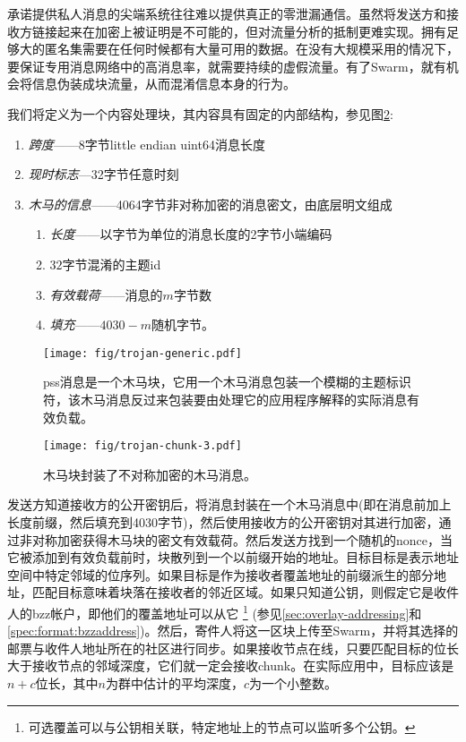 承诺提供私人消息的尖端系统往往难以提供真正的零泄漏通信\cite{kwon2016riffle}。虽然将发送方和接收方链接起来在加密上被证明是不可能的，但对流量分析的抵制更难实现。拥有足够大的匿名集需要在任何时候都有大量可用的数据。在没有大规模采用的情况下，要保证专用消息网络中的高消息率，就需要持续的虚假流量。有了Swarm，就有机会将信息伪装成块流量，从而混淆信息本身的行为。

我们将定义为一个内容处理块，其内容具有固定的内部结构，参见图\ref{fig:trojan-chunk}:

\begin{enumerate}
    \item \emph{跨度}——8字节little endian uint64消息长度  
    \item \emph{现时标志}—32字节任意时刻 
    \item \emph{木马的信息}——4064字节非对称加密的消息密文，由底层明文组成
\begin{enumerate}
        \item \emph{长度}——以字节为单位的消息长度的2字节小端编码
        \item $32$字节混淆的主题id   
        \item \emph{有效载荷}——消息的$m$字节数 
        \item \emph{填充}——$4030-m$随机字节。
    \end{enumerate}
\end{enumerate}

\begin{figure}[htbp]
\centering
\texttt{[image: fig/trojan-generic.pdf]}
\caption[木马块或pss message\statusgreen]{pss消息是一个木马块，它用一个木马消息包装一个模糊的主题标识符，该木马消息反过来包装要由处理它的应用程序解释的实际消息有效负载。}
\label{fig:trojan-generic}
\end{figure}

\begin{figure}[htbp]
\centering
\texttt{[image: fig/trojan-chunk-3.pdf]}
\caption[木马chunk\statusgreen]{木马块封装了不对称加密的木马消息。}
\label{fig:trojan-chunk}
\end{figure}

发送方知道接收方的公开密钥后，将消息封装在一个木马消息中(即在消息前加上长度前缀，然后填充到4030字节)，然后使用接收方的公开密钥对其进行加密，通过非对称加密获得木马块的密文有效载荷。然后发送方找到一个随机的nonce，当它被添加到有效负载前时，块散列到一个以前缀开始的地址。目标目标是表示地址空间中特定邻域的位序列。如果目标是作为接收者覆盖地址的前缀派生的部分地址，匹配目标意味着块落在接收者的邻近区域。如果只知道公钥，则假定它是收件人的bzz帐户，即他们的覆盖地址可以从它%
%
\footnote{可选覆盖可以与公钥相关联，特定地址上的节点可以监听多个公钥。}
%
(参见\ref{sec:overlay-addressing}和\ref{spec:format:bzzaddress})。然后，寄件人将这一区块上传至Swarm，并将其选择的邮票与收件人地址所在的社区进行同步。如果接收节点在线，只要匹配目标的位长大于接收节点的邻域深度，它们就一定会接收chunk。在实际应用中，目标应该是$n+c$位长，其中$n$为群中估计的平均深度，$c$为一个小整数。 

